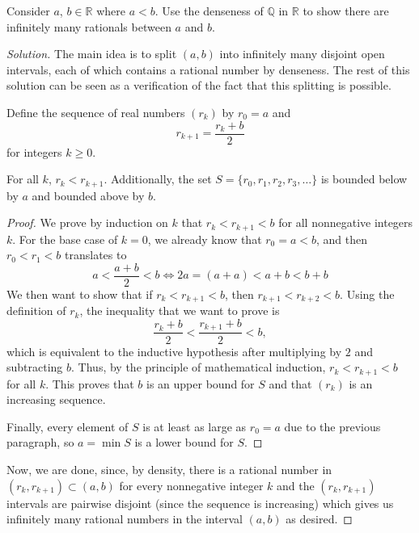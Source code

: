 \documentclass[11pt]{scrartcl}
\providecommand{\QQ}{\mathbb Q}
\providecommand{\RR}{\mathbb R}
\newenvironment{soln}{\begin{proof}[Solution]}{\end{proof}}
\begin{document}
\begin{problem*}[4.11]
	Consider $a$, $b\in \RR$ where $a < b$. Use the denseness of $\QQ$ in $\RR$
	to show there are infinitely many rationals between $a$ and $b$.
\end{problem*}
\begin{soln}
	The main idea is to split $(a, b)$ into infinitely many
	disjoint open intervals, each of which contains a rational number
	by denseness.
	The rest of this solution can be seen as a verification
	of the fact that this splitting is possible.
	
	Define the sequence of real numbers $(r_k)$ by $r_0 = a$ and
	\[r_{k+1} = \frac{r_k + b}{2}\]
	for integers $k\ge 0$.
	
	\begin{claim*}
		For all $k$, $r_k < r_{k+1}$.
		Additionally, the set $S = \{r_0, r_1, r_2, r_3, \dots\}$ is
		bounded below by $a$ and bounded above by $b$.
	\end{claim*}
	\begin{proof}
		We prove by induction on $k$ that $r_k < r_{k+1} < b$ for all
		nonnegative integers $k$.
		For the base case of $k = 0$, we already know that $r_0 = a < b$,
		and then $r_0 < r_1 < b$ translates to
		\[a < \frac{a + b}{2} < b \iff 2a = (a + a) < a + b < b + b \]
		We then want to show that if $r_k < r_{k+1} < b$,
		then $r_{k+1} < r_{k+2} < b$.
		Using the definition of $r_k$, the inequality that we want to prove is
		\[\frac{r_k + b}{2} < \frac{r_{k+1} + b}{2} < b,\]
		which is equivalent to the inductive hypothesis after multiplying by $2$
		and subtracting $b$.
		Thus, by the principle of mathematical induction,
		$r_k < r_{k+1} < b$ for all $k$.
		This proves that $b$ is an upper bound for $S$
		and that $(r_k)$ is an increasing sequence.
		
		Finally, every element of $S$ is at least as large as $r_0 = a$
		due to the previous paragraph, so $a = \min S$
		is a lower bound for $S$.
	\end{proof}
	
	Now, we are done, since, by density, there is a rational number
	in $(r_k, r_{k+1})\subset(a, b)$ for every nonnegative integer $k$
	and the $(r_k, r_{k+1})$ intervals are pairwise disjoint
	(since the sequence is increasing)
	which gives us infinitely many rational numbers in the interval $(a, b)$
	as desired.
\end{soln}
\end{document}
